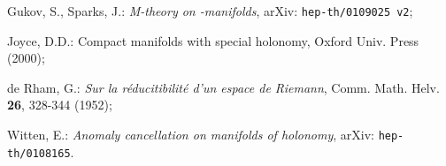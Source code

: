\documentclass[a4paper,12pt,draft]{article}
\begin{document}
\begin{thebibliography}{99}
 Gukov, S., Sparks, J.: {\it M-theory on \coordHE{}-manifolds}, arXiv: {\tt hep-th/0109025 v2};

 Joyce, D.D.: Compact manifolds with special holonomy, Oxford
Univ. Press (2000);

 de Rham, G.: {\it Sur la r\'educitibilit\'e d'un espace de
Riemann}, Comm. Math. Helv. {\bf 26}, 328-344 (1952);

 Witten, E.: {\it Anomaly cancellation on manifolds of \coordHE{}
holonomy}, arXiv: {\tt hep-th/0108165}.

\end{thebibliography} 
\end{document}
